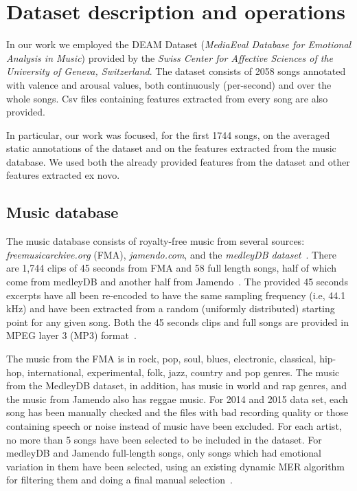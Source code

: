 \section{Dataset description and operations}\label{sec:dataset}

In our work we employed the DEAM Dataset (\emph{MediaEval Database for Emotional Analysis in Music}) provided by the \emph{Swiss Center for Affective Sciences of the University of Geneva, Switzerland}.
The dataset consists of 2058 songs annotated with valence and arousal values, both continuously (per-second) and over the whole songs. Csv files containing features extracted from every song are also provided.

In particular, our work was focused, for the first 1744 songs, on the averaged static annotations of the dataset and on the features extracted from the music database. We used both the already provided features from the dataset and other features extracted ex novo.

\subsection{Music database}\label{sec:database}

The music database consists of royalty-free music from several sources: \textit{freemusicarchive.org} (FMA), \textit{jamendo.com}, and the \textit{medleyDB dataset}~\cite{bittner2014medleydb}. There are 1,744 clips of 45 seconds from FMA and 58 full length songs, half of which come from medleyDB and another half from Jamendo~\cite{aljanaki2017developing}.
The provided 45 seconds excerpts have all been re-encoded to have the same sampling frequency (i.e, 44.1\,kHz) and have been extracted from a random (uniformly distributed) starting point for any given song. Both the 45 seconds clips and full songs are provided in MPEG layer 3 (MP3) format~\cite{soleymani2016deam}.

The music from the FMA is in rock, pop, soul, blues, electronic, classical, hip-hop, international, experimental, folk, jazz, country and pop genres. The music from the MedleyDB dataset, in addition, has music in world and rap genres, and the music from Jamendo also has reggae music. For 2014 and 2015 data set, each song has been manually checked and the files with bad recording quality or those containing speech or noise instead of music have been excluded. For each artist, no more than 5 songs have been selected to be included in the dataset. For medleyDB and Jamendo full-length songs, only songs which had emotional variation in them have been selected, using an existing dynamic MER algorithm for filtering them and doing a final manual selection~\cite{anna2015emotion}.



